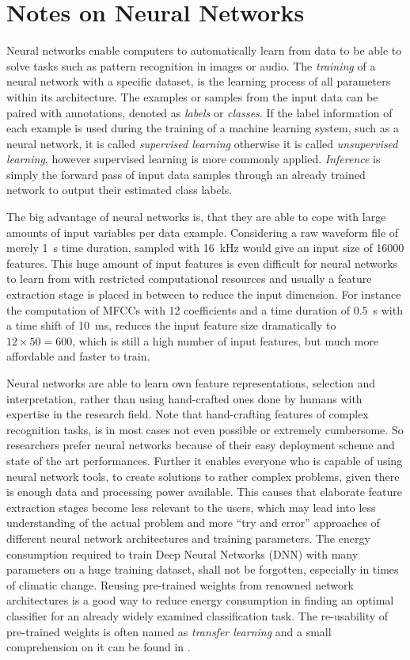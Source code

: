 
\section{Notes on Neural Networks}\label{sec:intro_nn}
Neural networks enable computers to automatically learn from data to be able to solve tasks such as pattern recognition in images or audio.
The \emph{training} of a neural network with a specific dataset, is the learning process of all parameters within its architecture.
The examples or samples from the input data can be paired with annotations, denoted as \emph{labels} or \emph{classes}.
If the label information of each example is used during the training of a machine learning system, such as a neural network, it is called \emph{supervised learning} otherwise it is called \emph{unsupervised learning}, however supervised learning is more commonly applied.
\emph{Inference} is simply the forward pass of input data samples through an already trained network to output their estimated class labels.

The big advantage of neural networks is, that they are able to cope with large amounts of input variables per data example.
Considering a raw waveform file of merely \SI{1}{s} time duration, sampled with \SI{16}{\kilo\hertz} would give an input size of 16000 features.
This huge amount of input features is even difficult for neural networks to learn from with restricted computational resources and usually a feature extraction stage is placed in between to reduce the input dimension.
For instance the computation of MFCCs with 12 coefficients and a time duration of \SI{0.5}{s} with a time shift of \SI{10}{\milli\second}, reduces the input feature size dramatically to $12 \times 50 = 600$, which is still a high number of input features, but much more affordable and faster to train.

Neural networks are able to learn own feature representations, selection and interpretation, rather than using hand-crafted ones done by humans with expertise in the research field.
Note that hand-crafting features of complex recognition tasks, is in most cases not even possible or extremely cumbersome.
So researchers prefer neural networks because of their easy deployment scheme and state of the art performances.
Further it enables everyone who is capable of using neural network tools, to create solutions to rather complex problems, given there is enough data and processing power available.
This causes that elaborate feature extraction stages become less relevant to the users, which may lead into less understanding of the actual problem and more \enquote{try and error} approaches of different neural network architectures and training parameters.
The energy consumption required to train Deep Neural Networks (DNN) with many parameters on a huge training dataset, shall not be forgotten, especially in times of climatic change.
Reusing pre-trained weights from renowned network architectures is a good way to reduce energy consumption in finding an optimal classifier for an already widely examined classification task.
The re-usability of pre-trained weights is often named as \emph{transfer learning} and a small comprehension on it can be found in \cite{TransferLearning}.

